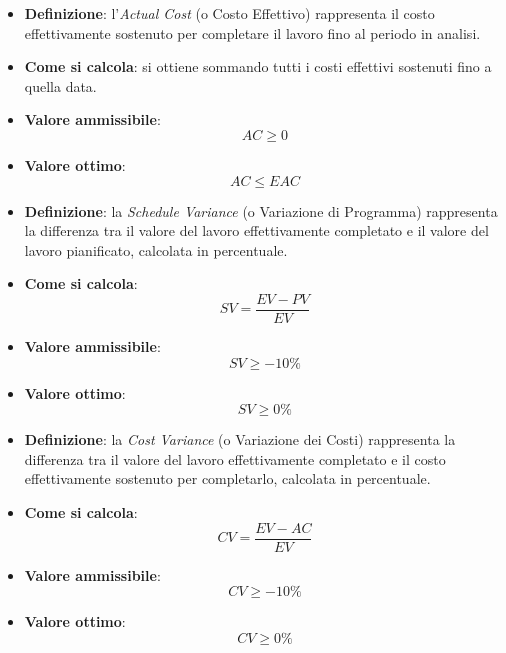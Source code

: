 \begin{itemize}
	\item \textbf{Definizione}: l'\textit{Actual Cost} (o Costo Effettivo) rappresenta il costo effettivamente sostenuto per completare il lavoro fino al periodo in analisi.
	\item \textbf{Come si calcola}: si ottiene sommando tutti i costi effettivi sostenuti fino a quella data.
	\item \textbf{Valore ammissibile}: \begin{equation*}AC \geq 0\end{equation*}
	\item \textbf{Valore ottimo}: \begin{equation*}AC \leq EAC\end{equation*}
\end{itemize}

\begin{itemize}
	\item \textbf{Definizione}: la \textit{Schedule Variance} (o Variazione di Programma) rappresenta la differenza tra il valore del lavoro effettivamente completato e il valore del lavoro pianificato, calcolata in percentuale.
	\item \textbf{Come si calcola}: \begin{equation*}SV = \frac{EV - PV}{EV}\end{equation*}
	\item \textbf{Valore ammissibile}: \begin{equation*}SV \geq -10\%\end{equation*}
	\item \textbf{Valore ottimo}: \begin{equation*}SV \geq 0\%\end{equation*}
\end{itemize}

\begin{itemize}
	\item \textbf{Definizione}: la \textit{Cost Variance} (o Variazione dei Costi) rappresenta la differenza tra il valore del lavoro effettivamente completato e il costo effettivamente sostenuto per completarlo, calcolata in percentuale.
	\item \textbf{Come si calcola}: \begin{equation*}CV = \frac{EV - AC}{EV}\end{equation*}
	\item \textbf{Valore ammissibile}: \begin{equation*}CV \geq -10\%\end{equation*}
	\item \textbf{Valore ottimo}: \begin{equation*}CV \geq 0\%\end{equation*}
\end{itemize}

